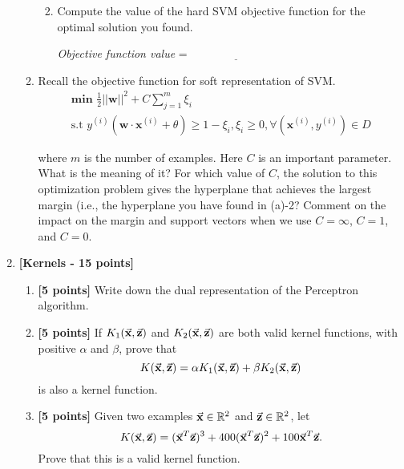 \begin{enumerate}
\begin{enumerate}
\begin{enumerate}
 \vspace{.2in}

\vspace{.2in}

\item[3.][$6$ points] Compute the value of the hard SVM objective function for the optimal solution you found.


 \vspace{.2in}
\emph{Objective function value} =  $\underline{\qquad\qquad\qquad\qquad}$
\vspace{.2in}
\end{enumerate}

\item[(c)][$13$ points] Recall the objective function for soft representation of SVM.
\begin{gather}
\textbf{min }   \frac{1}{2}||\mathbf{w}||^{2} + C\sum_{j=1}^{m}{\xi_{i}} \\
\text{s.t  } y^{(i)}(\mathbf{w}\cdot\mathbf{x}^{(i)}+\theta)\geq 1 - \xi_{i}, \xi_i\geq0, \forall (\mathbf{x}^{(i)},y^{(i)})\in D
\end{gather}

where $m$ is the number of examples. Here $C$ is an important parameter. What is the meaning of it? For which value of $C$, the solution to this optimization problem gives the hyperplane that achieves the largest margin (i.e., the hyperplane you have found in (a)-2? Comment on the impact on the margin and support vectors when we use $C = \infty$, $C = 1$, and $C = 0$.
\vspace{.7in}

\end{enumerate}

\item {\bf [Kernels - 15 points]}
  \begin{enumerate}
  \item {\bf [5 points]} Write down the dual representation of the
    Perceptron algorithm.

  \item {\bf [5 points]} If $K_1(\vec{\bf x},\vec{\bf z})$ and
    $K_2(\vec{\bf x},\vec{\bf z})$ are both valid kernel functions, with
    positive $\alpha$ and $\beta$, prove that
    \begin{equation*}
      K(\vec{\bf x},\vec{\bf z}) = \alpha K_1(\vec{\bf x},\vec{\bf z}) + \beta K_2(\vec{\bf x},\vec{\bf z})
    \end{equation*}
    is also a kernel function.

  \item {\bf [5 points]} Given two examples $\vec{\bf x} \in \mathbb{R}^2$ and
    $\vec{\bf z} \in \mathbb{R}^2$, let
    \begin{equation*}
      K(\vec{\bf x},\vec{\bf z}) = (\vec{\bf x}^T\vec{\bf z})^3 + 400(\vec{\bf x}^T\vec{\bf z})^2 + 100 \vec{\bf x}^T\vec{\bf z}.
    \end{equation*}
    Prove that this is a valid kernel function.


\end{enumerate}
\end{enumerate}

